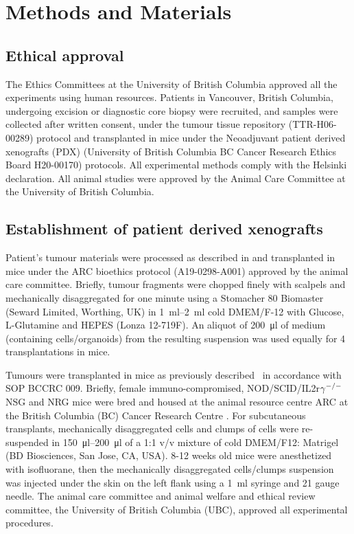 \chapter{Methods and Materials}

\section{Ethical approval}
The Ethics Committees at the University of British Columbia approved all the experiments using human resources. Patients in Vancouver, British Columbia, undergoing excision or diagnostic core biopsy were recruited, and samples were collected after written consent, under the tumour tissue repository (TTR-H06-00289) protocol and transplanted in mice under the Neoadjuvant patient derived xenografts (PDX) (University of British Columbia BC Cancer Research Ethics Board H20-00170) protocols. All experimental methods comply with the Helsinki declaration. All animal studies were approved by the Animal Care Committee at the University of British Columbia.  


\section{Establishment of patient derived xenografts} 
Patient's tumour materials were processed as described in \cite{eirew2015dynamics} and transplanted in mice under the \ac{ARC} bioethics protocol (A19-0298-A001) approved by the animal care committee.
Briefly, tumour fragments were chopped finely with scalpels and mechanically disaggregated for one minute using a Stomacher 80 Biomaster (Seward Limited, Worthing, UK) in \SIrange{1}{2}{\ml} cold DMEM/F-12 with Glucose, L-Glutamine and HEPES (Lonza 12-719F).
An aliquot of \SI{200}{\ul} of medium (containing cells/organoids) from the resulting suspension was used equally for 4 transplantations in mice.

Tumours were transplanted in mice as previously described~\cite{eirew2015dynamics} in accordance with SOP BCCRC 009. 
Briefly, female immuno-compromised, NOD/SCID/IL2r$\gamma^{\small{-/-}}$\ac{NSG} and        
\ac{NRG} \cite{pearson2008non} mice were bred and housed at the animal resource centre \ac{ARC} at the British Columbia (BC) Cancer Research Centre . 
For subcutaneous transplants, mechanically disaggregated cells and clumps of cells were re-suspended in \SIrange{150}{200}{\ul} of a 1:1 v/v mixture of cold DMEM/F12: Matrigel (BD Biosciences, San Jose, CA, USA).
8-12 weeks old mice were anesthetized with isofluorane, then the mechanically disaggregated cells/clumps suspension was injected under the skin on the left flank using a \SI{1}{\ml} syringe and 21 gauge needle. 
The animal care committee and animal welfare and ethical review committee, the University of British Columbia (UBC), approved all experimental procedures.

